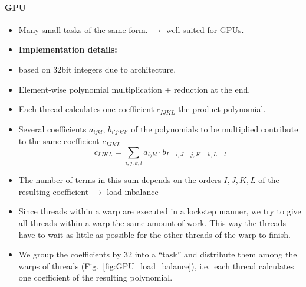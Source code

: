 \documentclass[oribibl]{llncs2e/llncs}
\begin{document}
\paragraph{GPU}
\begin{itemize}
\item Many small tasks of the same form. $\rightarrow$ well suited for GPUs.
\item {\bf Implementation details:}
\item based on 32bit integers due to architecture.
\item Element-wise polynomial multiplication + reduction at the end.
\item Each thread calculates one coefficient $c_{IJKL}$ the product polynomial.
\item Several coefficients $a_{ijkl}$, $b_{i'j'k'l'}$ of the polynomials to be multiplied contribute to the same coefficient $c_{IJKL}$
\begin{equation}
    c_{IJKL} = \sum_{i,j,k,l} a_{ijkl} \cdot b_{I-i,J-j,K-k,L-l}
\end{equation}
\item The number of terms in this sum depends on the orders $I,J,K,L$ of the resulting coefficient $\rightarrow$ load inbalance
\item Since threads within a warp are executed in a lockstep manner, we try to give all threads within a warp the same amount of work. This way the threads have to wait as little as possible for the other threads of the warp to finish.
\item We group the coefficients by 32 into a ``task'' and distribute them among the warps of threads (Fig.\ \ref{fig:GPU_load_balance}), i.e.\ each thread calculates one coefficient of the resulting polynomial.
\begin{figure}[t]
    \begin{center}
    \mbox{
}
\end{center}
\end{figure}
\end{itemize}
\end{document}
